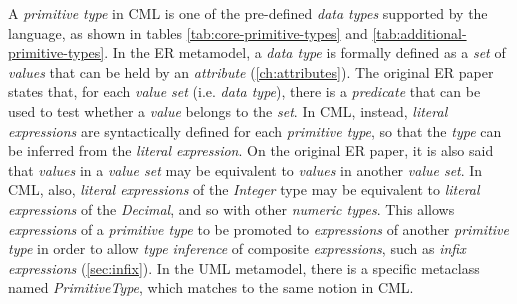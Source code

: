 \begin{definition}
A \emph{primitive type} in CML is one of the pre-defined \emph{data types}
supported by the language,
as shown in tables \ref{tab:core-primitive-types} and \ref{tab:additional-primitive-types}.
In the ER \cite{er} metamodel,
a \emph{data type} is formally defined as a \emph{set} of \emph{values}
that can be held by an \emph{attribute} (\ref{ch:attributes}).
The original ER paper \cite{er} states that,
for each \emph{value set} (i.e. \emph{data type}),
there is a \emph{predicate} that can be used to test
whether a \emph{value} belongs to the \emph{set}.
In CML, instead,
\emph{literal expressions} are syntactically defined for each \emph{primitive type},
so that the \emph{type} can be inferred from the \emph{literal expression}.
On the original ER paper,
it is also said that \emph{values} in a \emph{value set}
may be equivalent to \emph{values} in another \emph{value set}.
In CML, also,
\emph{literal expressions} of the \emph{Integer} type may be equivalent 
to \emph{literal expressions} of the \emph{Decimal},
and so with other \emph{numeric types}.
This allows \emph{expressions} of a \emph{primitive type}
to be promoted to \emph{expressions} of another \emph{primitive type}
in order to allow \emph{type inference} of composite \emph{expressions},
such as \emph{infix expressions} (\ref{sec:infix}).
In the UML \cite{uml} metamodel,
there is a specific metaclass named \emph{PrimitiveType},
which matches to the same notion in CML.
\end{definition}

